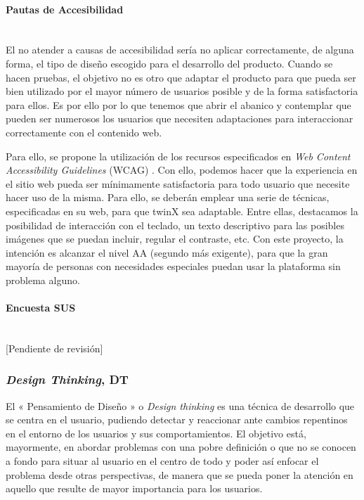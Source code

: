 \paragraph{Pautas de Accesibilidad}
\leavevmode\\[\baselineskip]

El no atender a causas de accesibilidad sería no aplicar correctamente, de alguna forma, el tipo de diseño escogido para el desarrollo del producto. Cuando se hacen pruebas, el objetivo no es otro que adaptar el producto para que pueda ser bien utilizado por el mayor número de usuarios posible y de la forma satisfactoria para ellos. Es por ello por lo que tenemos que abrir el abanico y contemplar que pueden ser numerosos los usuarios que necesiten adaptaciones para interaccionar correctamente con el contenido web.

Para ello, se propone la utilización de los recursos especificados en \textit{Web Content Accessibility Guidelines} (WCAG) \citep{wcag}. Con ello, podemos hacer que la experiencia en el sitio web pueda ser mínimamente satisfactoria para todo usuario que necesite hacer uso de la misma. Para ello, se deberán emplear una serie de técnicas, especificadas en su web, para que twinX sea adaptable. Entre ellas, destacamos la posibilidad de interacción con el teclado, un texto descriptivo para las posibles imágenes que se puedan incluir, regular el contraste, etc. Con este proyecto, la intención es alcanzar el nivel AA (segundo más exigente), para que la gran mayoría de personas con necesidades especiales puedan usar la plataforma sin problema alguno.

\paragraph{Encuesta SUS}
\leavevmode\\[\baselineskip]

[Pendiente de revisión]

\subsubsection{\textit{Design Thinking}, DT}

El « Pensamiento de Diseño » o \textit{Design thinking} es una técnica de desarrollo que se centra en el usuario, pudiendo detectar y reaccionar ante cambios repentinos en el entorno de los usuarios y sus comportamientos. El objetivo está, mayormente, en abordar problemas con una pobre definición o que no se conocen a fondo para situar al usuario en el centro de todo y poder así enfocar el problema desde otras perspectivas, de manera que se pueda poner la atención en aquello que resulte de mayor importancia para los usuarios.

